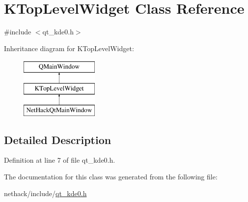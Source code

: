 \hypertarget{classKTopLevelWidget}{\section{K\+Top\+Level\+Widget Class Reference}
\label{classKTopLevelWidget}
}


{\ttfamily \#include $<$qt\+\_\+kde0.\+h$>$}

Inheritance diagram for K\+Top\+Level\+Widget\+:\begin{figure}[H]
\begin{center}
\leavevmode
\includegraphics[height=3.000000cm]{classKTopLevelWidget}
\end{center}
\end{figure}


\subsection{Detailed Description}


Definition at line 7 of file qt\+\_\+kde0.\+h.



The documentation for this class was generated from the following file\+:\begin{DoxyCompactItemize}
\item 
nethack/include/\hyperlink{qt__kde0_8h}{qt\+\_\+kde0.\+h}\end{DoxyCompactItemize}
